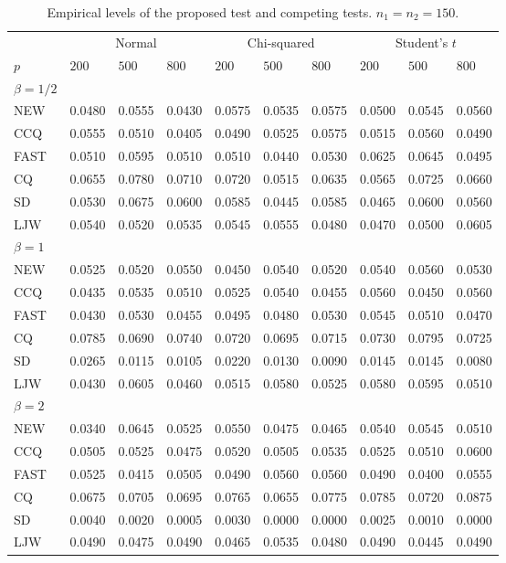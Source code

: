\documentclass[times,sort&compress,3p]{elsarticle}
\theoremstyle{plain}
\theoremstyle{definition}
\theoremstyle{remark}
\begin{document}
\begin{table}[ht]
\caption{Empirical levels of the proposed test and competing tests. $n_1=n_2=150$.} 
\label{hahaha3}
\vspace{3mm}
\centering
\begin{tabular}{llllllllll}
\toprule
    &   \multicolumn{3}{c}{Normal} & \multicolumn{3}{c}{Chi-squared}& \multicolumn{3}{c}{Student's $t$}  \\
    \cmidrule(r){2-4}
\cmidrule(r){5-7}
\cmidrule(r){8-10}
    $p$ & $200$ &  $500$ & $800$ & $200$  & $500$ & $800$ & $200$ & $500$ & $800$ \\ 
\midrule
    $\beta=1/2$\\
NEW & 0.0480 & 0.0555 & 0.0430 & 0.0575 & 0.0535 & 0.0575 & 0.0500 & 0.0545 & 0.0560 \\ 
CCQ & 0.0555 & 0.0510 & 0.0405 & 0.0490 & 0.0525 & 0.0575 & 0.0515 & 0.0560 & 0.0490 \\ 
FAST & 0.0510 & 0.0595 & 0.0510 & 0.0510 & 0.0440 & 0.0530 & 0.0625 & 0.0645 & 0.0495 \\ 
CQ & 0.0655 & 0.0780 & 0.0710 & 0.0720 & 0.0515 & 0.0635 & 0.0565 & 0.0725 & 0.0660 \\ 
SD & 0.0530 & 0.0675 & 0.0600 & 0.0585 & 0.0445 & 0.0585 & 0.0465 & 0.0600 & 0.0560 \\ 
LJW & 0.0540 & 0.0520 & 0.0535 & 0.0545 & 0.0555 & 0.0480 & 0.0470 & 0.0500 & 0.0605 \\ 
    $\beta=1$\\
NEW & 0.0525 & 0.0520 & 0.0550 & 0.0450 & 0.0540 & 0.0520 & 0.0540 & 0.0560 & 0.0530 \\ 
CCQ & 0.0435 & 0.0535 & 0.0510 & 0.0525 & 0.0540 & 0.0455 & 0.0560 & 0.0450 & 0.0560 \\ 
FAST & 0.0430 & 0.0530 & 0.0455 & 0.0495 & 0.0480 & 0.0530 & 0.0545 & 0.0510 & 0.0470 \\ 
CQ & 0.0785 & 0.0690 & 0.0740 & 0.0720 & 0.0695 & 0.0715 & 0.0730 & 0.0795 & 0.0725 \\ 
SD & 0.0265 & 0.0115 & 0.0105 & 0.0220 & 0.0130 & 0.0090 & 0.0145 & 0.0145 & 0.0080 \\ 
LJW & 0.0430 & 0.0605 & 0.0460 & 0.0515 & 0.0580 & 0.0525 & 0.0580 & 0.0595 & 0.0510 \\ 
    $\beta=2$\\
NEW & 0.0340 & 0.0645 & 0.0525 & 0.0550 & 0.0475 & 0.0465 & 0.0540 & 0.0545 & 0.0510 \\ 
CCQ & 0.0505 & 0.0525 & 0.0475 & 0.0520 & 0.0505 & 0.0535 & 0.0525 & 0.0510 & 0.0600 \\ 
FAST & 0.0525 & 0.0415 & 0.0505 & 0.0490 & 0.0560 & 0.0560 & 0.0490 & 0.0400 & 0.0555 \\ 
CQ & 0.0675 & 0.0705 & 0.0695 & 0.0765 & 0.0655 & 0.0775 & 0.0785 & 0.0720 & 0.0875 \\ 
SD & 0.0040 & 0.0020 & 0.0005 & 0.0030 & 0.0000 & 0.0000 & 0.0025 & 0.0010 & 0.0000 \\ 
LJW & 0.0490 & 0.0475 & 0.0490 & 0.0465 & 0.0535 & 0.0480 & 0.0490 & 0.0445 & 0.0490 \\ 
\bottomrule
\end{tabular}
\end{table}
\end{document}
